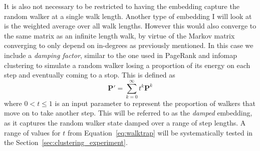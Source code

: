 It is also not necessary to be restricted to having the embedding capture the random walker at a single walk length. Another type of embedding I will look at is the weighted average over all walk lengths. However this would also converge to the same matrix as an infinite length walk, by virtue of the Markov matrix converging to only depend on in-degrees as previously mentioned. In this case we include a \emph{damping factor}, similar to the one used in PageRank \cite{Page1999} and infomap clustering \cite{Rosvall2008} to simulate a random walker losing a proportion of its energy on each step and eventually coming to a stop. This is defined as
\begin{equation}
    \mathbf{P}' = \sum_{k=0}^\infty t^k\mathbf{P}^{k}
    \label{eq:damped}
\end{equation}
where $0<t\leq 1$ is an input parameter to represent the proportion of walkers that move on to take another step. This will be referred to as the \emph{damped} embedding, as it captures the random walker state damped over a range of step lengths. A range of values for $t$ from Equation~\eqref{eq:walktrap} will be systematically tested in the Section~\ref{sec:clustering_experiment}.

